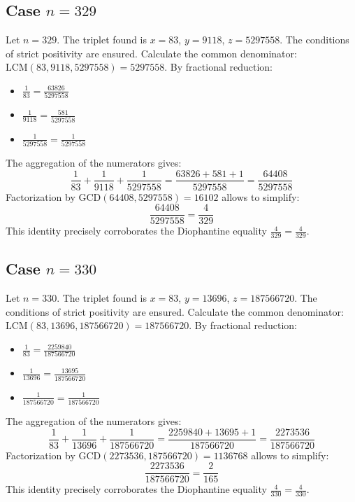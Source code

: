 \documentclass[11pt,a4paper]{article}
\begin{document}
\subsection{Case $n = 329$}
Let $n = 329$. The triplet found is $x = 83$, $y = 9118$, $z = 5297558$.
The conditions of strict positivity are ensured.
Calculate the common denominator: $\text{LCM}(83, 9118, 5297558) = 5297558$.
By fractional reduction:
\begin{itemize}
    \item $\frac{1}{83} = \frac{63826}{5297558}$
    \item $\frac{1}{9118} = \frac{581}{5297558}$
    \item $\frac{1}{5297558} = \frac{1}{5297558}$
\end{itemize}
The aggregation of the numerators gives:
$$ \frac{1}{83} + \frac{1}{9118} + \frac{1}{5297558} = \frac{63826 + 581 + 1}{5297558} = \frac{64408}{5297558} $$
Factorization by $\text{GCD}(64408, 5297558) = 16102$ allows to simplify:
$$ \frac{64408}{5297558} = \frac{4}{329} $$
This identity precisely corroborates the Diophantine equality $\frac{4}{329} = \frac{4}{329}$.

\subsection{Case $n = 330$}
Let $n = 330$. The triplet found is $x = 83$, $y = 13696$, $z = 187566720$.
The conditions of strict positivity are ensured.
Calculate the common denominator: $\text{LCM}(83, 13696, 187566720) = 187566720$.
By fractional reduction:
\begin{itemize}
    \item $\frac{1}{83} = \frac{2259840}{187566720}$
    \item $\frac{1}{13696} = \frac{13695}{187566720}$
    \item $\frac{1}{187566720} = \frac{1}{187566720}$
\end{itemize}
The aggregation of the numerators gives:
$$ \frac{1}{83} + \frac{1}{13696} + \frac{1}{187566720} = \frac{2259840 + 13695 + 1}{187566720} = \frac{2273536}{187566720} $$
Factorization by $\text{GCD}(2273536, 187566720) = 1136768$ allows to simplify:
$$ \frac{2273536}{187566720} = \frac{2}{165} $$
This identity precisely corroborates the Diophantine equality $\frac{4}{330} = \frac{4}{330}$.
\end{document}
